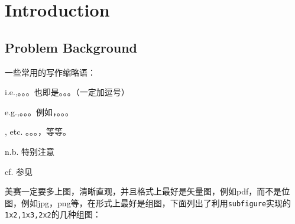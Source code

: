 \documentclass[12pt]{ctexart}
\begin{document}
\maketitle  %

\tableofcontents  %




\section{Introduction}
\subsection{Problem Background}%
一些常用的写作缩略语：

i.e.,。。。也即是。。。（一定加逗号）

e.g.,。。。例如，。。。

, etc.    。。。，等等。

n.b.   特别注意

cf.  参见


美赛一定要多上图，清晰直观，并且格式上最好是矢量图，例如pdf，而不是位图，例如jpg，png等，在形式上最好是组图，下面列出了利用\verb|subfigure|实现的
\verb|1x2,1x3,2x2|的几种组图：
\end{document}
